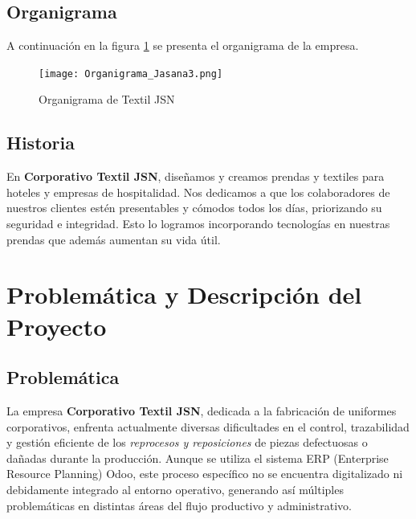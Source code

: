\documentclass[12pt,letterpaper,spanish]{report}
\begin{document}
\section{Organigrama}
A continuación en la figura \ref{a2} se presenta el organigrama de la empresa.

\begin{figure}[htp]
  \centering
  \texttt{[image: Organigrama\_Jasana3.png]}
  \caption{Organigrama de Textil JSN}\label{a2}
\end{figure}

\section{Historia}
En \textbf{Corporativo Textil JSN}, diseñamos y creamos prendas y textiles para hoteles y empresas de hospitalidad.
Nos dedicamos a que los colaboradores de nuestros clientes estén presentables y cómodos todos los días, priorizando su seguridad e integridad.
Esto lo logramos incorporando tecnologías en nuestras prendas que además aumentan su vida útil.


\newpage




\chapter{Problemática y Descripción del Proyecto}
\newpage

\section{Problemática}

La empresa \textbf{Corporativo Textil JSN}, dedicada a la fabricación de uniformes corporativos, enfrenta actualmente diversas dificultades en el control, trazabilidad y gestión eficiente de los \textit{reprocesos y reposiciones} de piezas defectuosas o dañadas durante la producción. Aunque se utiliza el sistema ERP (Enterprise Resource Planning) Odoo, este proceso específico no se encuentra digitalizado ni debidamente integrado al entorno operativo, generando así múltiples problemáticas en distintas áreas del flujo productivo y administrativo.
\end{document}

